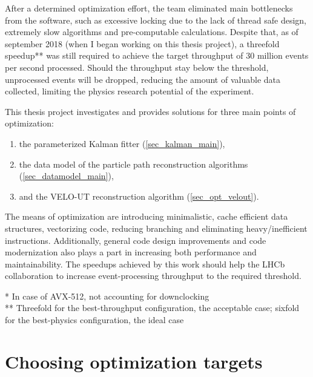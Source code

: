 \documentclass[12pt]{article}
\newcommand\tab[1][.7cm]{\hspace*{#1}}
\begin{document}
\vspace{1pc}
After a determined optimization effort, the team eliminated main bottlenecks from the software, such as excessive locking due to the lack of thread safe design, extremely slow algorithms and pre-computable calculations. Despite that, as of september 2018 (when I began working on this thesis project), a threefold speedup** was still required to achieve the target throughput of 30 million events per second processed. Should the throughput stay below the threshold, unprocessed events will be dropped, reducing the amount of valuable data collected, limiting the physics research potential of the experiment.

\vspace{1pc}
This thesis project investigates and provides solutions for three main points of optimization:
\begin{enumerate}
	\item the parameterized Kalman fitter (\ref{sec_kalman_main}),
	\item the data model of the particle path reconstruction algorithms (\ref{sec_datamodel_main}),
	\item and the VELO-UT reconstruction algorithm (\ref{sec_opt_velout}).
\end{enumerate}
The means of optimization are introducing minimalistic, cache efficient data structures, vectorizing code, reducing branching and eliminating heavy/inefficient instructions. Additionally, general code design improvements and code modernization also plays a part in increasing both performance and maintainability. The speedups achieved by this work should help the LHCb collaboration to increase event-processing throughput to the required threshold.

\vspace{1pc}
\small
\noindent\tab* In case of AVX-512, not accounting for downclocking\\
\noindent\tab** Threefold for the best-throughput configuration, the acceptable case; sixfold for the best-physics configuration, the ideal case
\normalsize


\newpage
\section{Choosing optimization targets}
\end{document}
